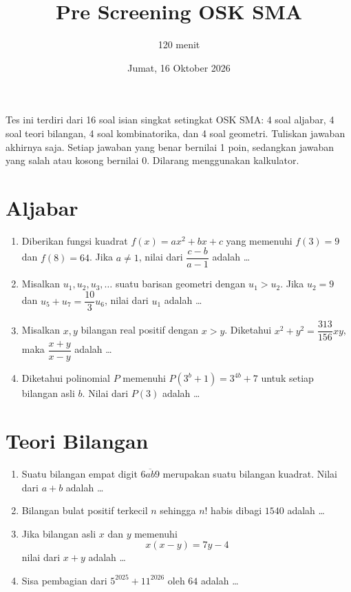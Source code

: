 \documentclass[12pt]{scrartcl}
\title{Pre Screening OSK SMA}
\author{120 menit}
\date{Jumat, 16 Oktober 2026}
\begin{document}
\maketitle

\renewcommand*\contentsname{Daftar Isi}
\tableofcontents

\newpage

\noindent Tes ini terdiri dari 16 soal isian singkat setingkat OSK SMA:
4 soal aljabar, 4 soal teori bilangan, 4 soal kombinatorika, dan 4 soal geometri.
Tuliskan jawaban akhirnya saja. Setiap jawaban yang benar bernilai 1 poin,
sedangkan jawaban yang salah atau kosong bernilai 0. Dilarang menggunakan kalkulator.

\section{Aljabar}
\begin{enumerate}
	\item Diberikan fungsi kuadrat $f(x)=ax^{2}+bx+c$ yang memenuhi $f(3)=9$ dan $f(8)=64$.
	Jika $a \ne 1$, nilai dari $\dfrac{c-b}{a-1}$ adalah \dots

	\item Misalkan $u_{1},u_{2},u_{3},\dots$ suatu barisan geometri dengan $u_{1}>u_{2}$.
	Jika $u_{2}=9$ dan $u_{5}+u_{7}=\dfrac{10}{3}u_{6}$, nilai dari $u_{1}$ adalah \dots

	\item Misalkan $x, y$ bilangan real positif dengan $x>y$.
	Diketahui $x^{2}+y^{2}=\dfrac{313}{156}xy$, maka $\dfrac{x+y}{x-y}$ adalah \dots

	\item Diketahui polinomial $P$ memenuhi $P(3^{b}+1)=3^{4b}+7$ untuk setiap bilangan asli $b$.
	Nilai dari $P(3)$ adalah \dots
\end{enumerate}

\section{Teori Bilangan}
\begin{enumerate}[resume]
	\item Suatu bilangan empat digit $\overline{6ab9}$ merupakan suatu bilangan kuadrat.
	Nilai dari $a+b$ adalah \dots

	\item Bilangan bulat positif terkecil $n$ sehingga $n!$ habis dibagi $1540$ adalah \dots

	\item Jika bilangan asli $x$ dan $y$ memenuhi
	\[ x(x-y)=7y-4 \]
	nilai dari $x+y$ adalah \dots

	\item Sisa pembagian dari $5^{2025}+11^{2026}$ oleh $64$ adalah \dots
\end{enumerate}
\end{document}
